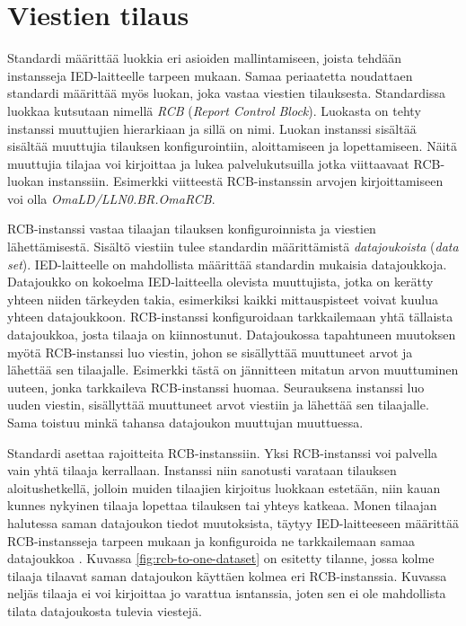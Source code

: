 \section{Viestien tilaus}
Standardi määrittää luokkia eri asioiden mallintamiseen, joista tehdään instansseja IED-laitteelle tarpeen mukaan. Samaa periaatetta noudattaen standardi määrittää myös luokan, joka vastaa viestien tilauksesta. Standardissa luokkaa kutsutaan nimellä \emph{RCB} (\emph{Report Control Block}). Luokasta on tehty instanssi muuttujien hierarkiaan ja sillä on nimi. Luokan instanssi sisältää sisältää muuttujia tilauksen konfigurointiin, aloittamiseen ja lopettamiseen. Näitä muuttujia tilajaa voi kirjoittaa ja lukea palvelukutsuilla jotka viittaavaat RCB-luokan instanssiin. Esimerkki viitteestä RCB-instanssin arvojen kirjoittamiseen voi olla \emph{OmaLD/LLN0.BR.OmaRCB}. \mbox{\cite[s.~95--97]{IEC61850-7-2}}

RCB-instanssi vastaa tilaajan tilauksen konfiguroinnista ja viestien lähettämisestä. Sisältö viestiin tulee standardin määrittämistä \emph{datajoukoista} (\emph{data set}). IED-laitteelle on mahdollista määrittää standardin mukaisia datajoukkoja. Datajoukko on kokoelma IED-laitteella olevista muuttujista, jotka on kerätty yhteen niiden tärkeyden takia, esimerkiksi kaikki mittauspisteet voivat kuulua yhteen datajoukkoon. RCB-instanssi konfiguroidaan tarkkailemaan yhtä tällaista datajoukkoa, josta tilaaja on kiinnostunut. Datajoukossa tapahtuneen muutoksen myötä RCB-instanssi luo viestin, johon se sisällyttää muuttuneet arvot ja lähettää sen tilaajalle. Esimerkki tästä on jännitteen mitatun arvon muuttuminen uuteen, jonka tarkkaileva RCB-instanssi huomaa. Seurauksena instanssi luo uuden viestin, sisällyttää muuttuneet arvot viestiin ja lähettää sen tilaajalle. Sama toistuu minkä tahansa datajoukon muuttujan muuttuessa. \mbox{\cite[s.~93]{IEC61850-7-2}}

Standardi asettaa rajoitteita RCB-instanssiin. Yksi RCB-instanssi voi palvella vain yhtä tilaaja kerrallaan. Instanssi niin sanotusti varataan tilauksen aloitushetkellä, jolloin muiden tilaajien kirjoitus luokkaan estetään, niin kauan kunnes nykyinen tilaaja lopettaa tilauksen tai yhteys katkeaa. Monen tilaajan halutessa saman datajoukon tiedot muutoksista, täytyy IED-laitteeseen määrittää RCB-instansseja tarpeen mukaan ja konfiguroida ne tarkkailemaan samaa datajoukkoa \cite[s.~93]{IEC61850-7-2}. Kuvassa \ref{fig:rcb-to-one-dataset} on esitetty tilanne, jossa kolme tilaaja tilaavat saman datajoukon käyttäen kolmea eri RCB-instanssia. Kuvassa neljäs tilaaja ei voi kirjoittaa jo varattua isntanssia, joten sen ei ole mahdollista tilata datajoukosta tulevia viestejä.

